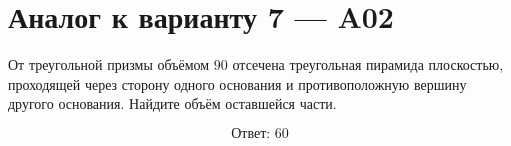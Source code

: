 \documentclass[12pt,a4paper]{article}
\begin{document}
\section*{Аналог к варианту 7 — A02}

От треугольной призмы объёмом \(90\) отсечена треугольная пирамида плоскостью, проходящей через сторону одного основания и противоположную вершину другого основания. Найдите объём оставшейся части.

\begin{center}
\end{center}

\[
\boxed{\text{Ответ: }60}
\]
\end{document}
